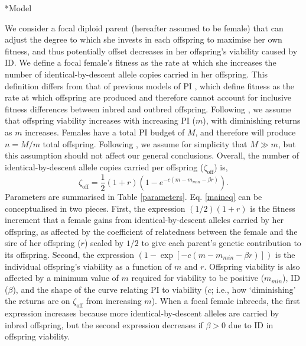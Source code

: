 \documentclass[12pt]{article}
\makeatletter
\renewcommand\section{\@startsection{section}{1}{0in}{-0.5\baselineskip}{0.1\baselineskip}{\normalfont\large\bfseries}}
\makeatother
\begin{document}

\section*{Model}

We consider a focal diploid parent (hereafter assumed to be female) that can adjust the degree to which she invests in each offspring to maximise her own fitness, and thus potentially offset decreases in her offspring's viability caused by ID. We define a focal female's fitness as the rate at which she increases the number of identical-by-descent allele copies carried in her offspring. This definition differs from that of previous models of PI \cite[e.g.,][]{Macnair1978, Parker1978}, which define fitness as the rate at which offspring are produced and therefore cannot account for inclusive fitness differences between inbred and outbred offspring. Following \cite{Parker1978}, we assume that offspring viability increases with increasing PI ($m$), with diminishing returns as $m$ increases. Females have a total PI budget of $M$, and therefore will produce $n=M/m$ total offspring. Following \cite{Parker1985}, we assume for simplicity that $M \gg m$, but this assumption should not affect our general conclusions. Overall, the number of identical-by-descent allele copies carried per offspring ($\zeta_{\textrm{off}}$) is,
\begin{equation} \label{maineq}
\zeta_{\textrm{off}} = \frac{1}{2}\left(1+r\right)\left(1-e^{-c\left(m-m_{min}-\beta r\right)}\right).
\end{equation}
Parameters are summarised in Table \ref{parameters}. Eq. \ref{maineq} can be conceptualised in two pieces. First, the expression $\left(1/2\right) \left(1 + r\right)$ is the fitness increment that a female gains from identical-by-descent alleles carried by her offspring, as affected by the coefficient of relatedness between the female and the sire of her offspring ($r$) scaled by $1/2$ to give each parent's genetic contribution to its offspring. Second, the expression $\left(1 - \exp\left[-c\left(m-m_{min}-\beta r\right)\right]\right)$ is the individual offspring's viability as a function of $m$ and $r$. Offspring viability is also affected by a minimum value of $m$ required for viability to be positive ($m_{min}$), ID ($\beta$), and the shape of the curve relating PI to viability ($c$; i.e., how `diminishing' the returns are on $\zeta_{\textrm{off}}$ from increasing $m$). When a focal female inbreeds, the first expression increases because more identical-by-descent alleles are carried by inbred offspring, but the second expression decreases if $\beta>0$ due to ID in offspring viability.
\end{document}
